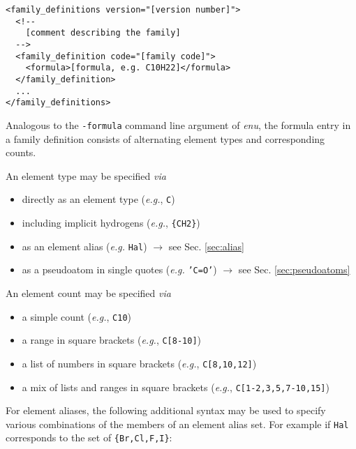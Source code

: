 \documentclass[a4paper,11pt]{article}
\begin{document}
\begin{lstlisting}
<family_definitions version="[version number]">
  <!--
    [comment describing the family]
  -->
  <family_definition code="[family code]">
    <formula>[formula, e.g. C10H22]</formula>
  </family_definition>
  ...
</family_definitions>
\end{lstlisting}

Analogous to the \texttt{-formula} command line argument of \textit{enu}, the formula entry in a family definition consists of alternating element types and corresponding counts. 

An element type may be specified \textit{via}

\begin{itemize}
  \item directly as an element type (\textit{e.g.}, \texttt{C})
  \item including implicit hydrogens (\textit{e.g.}, \texttt{\{CH2\}})
  \item as an element alias (\textit{e.g.} \texttt{Hal}) $\rightarrow$ see Sec. \ref{sec:alias}
  \item as a pseudoatom in single quotes (\textit{e.g.} \texttt{'C=O'}) $\rightarrow$ see Sec. \ref{sec:pseudoatoms}
\end{itemize}

An element count may be specified \textit{via}

\begin{itemize}
  \item a simple count (\textit{e.g.}, \texttt{C10})
  \item a range in square brackets (\textit{e.g.}, \texttt{C[8-10]})
  \item a list of numbers in square brackets (\textit{e.g.}, \texttt{C[8,10,12]})
  \item a mix of lists and ranges in square brackets (\textit{e.g.}, \texttt{C[1-2,3,5,7-10,15]})
\end{itemize}

For element aliases, the following additional syntax may be used to specify various combinations of the members of an element alias set. For example if \texttt{Hal} corresponds to the set of \texttt{\{Br,Cl,F,I\}}:
\end{document}
